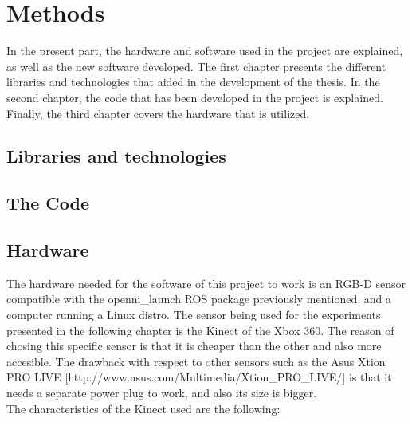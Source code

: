 \part*{Methods}
In the present part, the hardware and software used in the project are explained, as well as the new software developed. 
The first chapter presents the different libraries and technologies that aided in the development of the thesis. 
In the second chapter, the code that has been developed in the project is explained.
Finally, the third chapter covers the hardware that is utilized.


\chapter*{Libraries and technologies}



\chapter*{The Code}
  

\chapter*{Hardware}
The hardware needed for the software of this project to work is an RGB-D sensor compatible with the openni_launch ROS package previously mentioned, and a computer running a Linux distro. 
The sensor being used for the experiments presented in the following chapter is the Kinect of the Xbox 360. The reason of chosing this specific sensor is that it is cheaper than the other
and also more accesible. The drawback with respect to other sensors such as the Asus Xtion PRO LIVE [http://www.asus.com/Multimedia/Xtion_PRO_LIVE/] is that it needs a separate power plug to work, and also its size is bigger. 
\\

The characteristics of the Kinect used are the following: 



